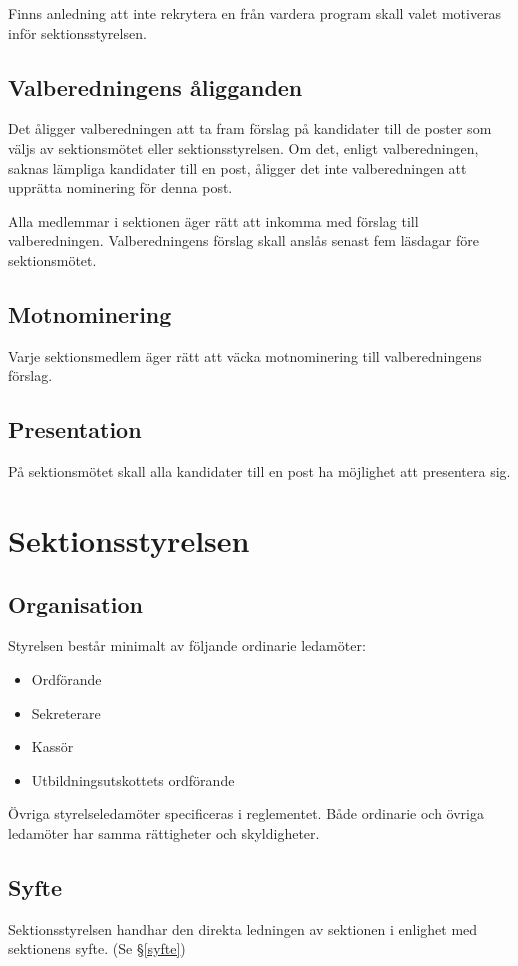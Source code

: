 \documentclass{datateknologsektionen-document}
\begin{document}
      Finns anledning att inte rekrytera en från vardera program skall valet motiveras inför sektionsstyrelsen.

    \subsection{Valberedningens åligganden}
      Det åligger valberedningen att ta fram förslag på kandidater till de poster som väljs av
      sektionsmötet eller sektionsstyrelsen. Om det, enligt valberedningen, saknas lämpliga
      kandidater till en post, åligger det inte valberedningen att upprätta nominering för denna
      post.

      Alla medlemmar i sektionen äger rätt att inkomma med förslag till valberedningen.
      Valberedningens förslag skall anslås senast fem läsdagar före sektionsmötet.
    \subsection{Motnominering}
      Varje sektionsmedlem äger rätt att väcka motnominering till valberedningens förslag.
    \subsection{Presentation}
      På sektionsmötet skall alla kandidater till en post ha möjlighet att presentera sig.
  \section{Sektionsstyrelsen}
    \subsection{Organisation}
      Styrelsen består minimalt av följande ordinarie ledamöter:
      \begin{itemize}
        \item Ordförande
        \item Sekreterare
        \item Kassör
        \item Utbildningsutskottets ordförande
      \end{itemize}
      Övriga styrelseledamöter specificeras i reglementet. Både ordinarie och övriga ledamöter
      har samma rättigheter och skyldigheter.
    \subsection{Syfte}
      Sektionsstyrelsen handhar den direkta ledningen av sektionen i enlighet med sektionens
      syfte. (Se \S \ref{syfte})
\end{document}
